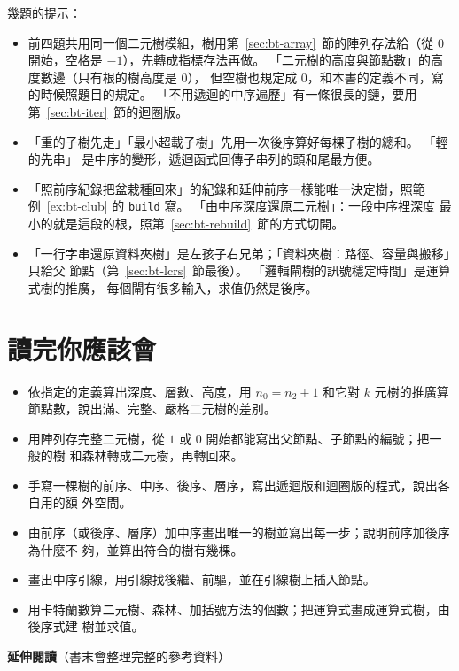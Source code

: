 幾題的提示：

\begin{itemize}
\item 前四題共用同一個二元樹模組，樹用第~\ref{sec:bt-array}~節的陣列存法給（從 $0$
開始，空格是 $-1$），先轉成指標存法再做。 「二元樹的高度與節點數」的高度數邊（只有根的樹高度是 $0$），
但空樹也規定成 $0$，和本書的定義不同，寫的時候照題目的規定。 「不用遞迴的中序遍歷」有一條很長的鏈，要用第~\ref{sec:bt-iter}~節的迴圈版。
\item 「重的子樹先走」「最小超載子樹」先用一次後序算好每棵子樹的總和。 「輕的先串」
是中序的變形，遞迴函式回傳子串列的頭和尾最方便。
\item 「照前序紀錄把盆栽種回來」的紀錄和延伸前序一樣能唯一決定樹，照範
例~\ref{ex:bt-club} 的 \texttt{build} 寫。 「由中序深度還原二元樹」：一段中序裡深度
最小的就是這段的根，照第~\ref{sec:bt-rebuild}~節的方式切開。
\item 「一行字串還原資料夾樹」是左孩子右兄弟；「資料夾樹：路徑、容量與搬移」只給父
節點（第~\ref{sec:bt-lcrs}~節最後）。 「邏輯閘樹的訊號穩定時間」是運算式樹的推廣，
每個閘有很多輸入，求值仍然是後序。
\end{itemize}

\section{讀完你應該會}
\label{sec:bt-checklist}

\begin{itemize}
\item 依指定的定義算出深度、層數、高度，用 $n_0 = n_2 + 1$ 和它對 $k$ 元樹的推廣算
節點數，說出滿、完整、嚴格二元樹的差別。
\item 用陣列存完整二元樹，從 $1$ 或 $0$ 開始都能寫出父節點、子節點的編號；把一般的樹
和森林轉成二元樹，再轉回來。
\item 手寫一棵樹的前序、中序、後序、層序，寫出遞迴版和迴圈版的程式，說出各自用的額
外空間。
\item 由前序（或後序、層序）加中序畫出唯一的樹並寫出每一步；說明前序加後序為什麼不
夠，並算出符合的樹有幾棵。
\item 畫出中序引線，用引線找後繼、前驅，並在引線樹上插入節點。
\item 用卡特蘭數算二元樹、森林、加括號方法的個數；把運算式畫成運算式樹，由後序式建
樹並求值。
\end{itemize}

\textbf{延伸閱讀}（書末會整理完整的參考資料）

